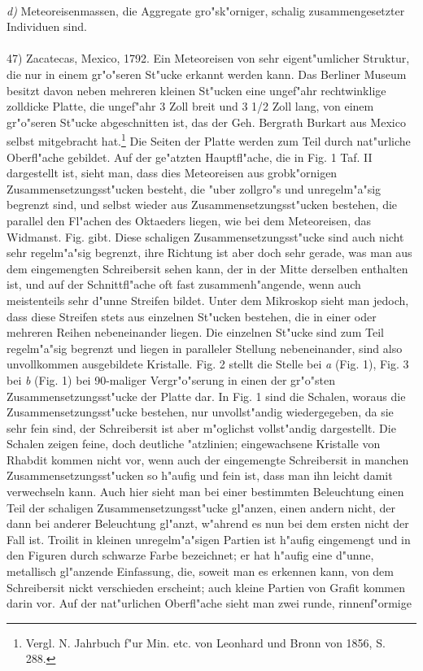 \documentclass[a4paper, 11pt, oneside]{article}
\begin{document}
\paragraph{}
\emph{d)} Meteoreisenmassen, die Aggregate gro"sk"orniger, schalig zusammengesetzter Individuen sind.
\vspace{\medskipamount}
\paragraph{}
47) Zacatecas, Mexico, 1792. Ein Meteoreisen von sehr eigent"umlicher Struktur, die nur in einem gr"o"seren St"ucke erkannt werden kann. Das Berliner Museum besitzt davon neben mehreren kleinen St"ucken eine ungef"ahr rechtwinklige zolldicke Platte, die ungef"ahr 3 Zoll breit und 3 1/2 Zoll lang, von einem gr"o"seren St"ucke abgeschnitten ist, das der Geh. Bergrath Burkart aus Mexico selbst mitgebracht hat.\footnote{Vergl. N. Jahrbuch f"ur Min. etc. von Leonhard und Bronn von 1856, S. 288.} Die Seiten der Platte werden zum Teil durch nat"urliche Oberfl"ache gebildet. Auf der ge"atzten Hauptfl"ache, die in Fig. 1 Taf. II dargestellt ist, sieht man, dass dies Meteoreisen aus grobk"ornigen Zusammensetzungsst"ucken besteht, die "uber zollgro"s und unregelm"a"sig begrenzt sind, und selbst wieder aus Zusammensetzungsst"ucken bestehen, die parallel den Fl"achen des Oktaeders liegen, wie bei dem Meteoreisen, das Widmanst. Fig. gibt. Diese schaligen Zusammensetzungsst"ucke sind auch nicht sehr regelm"a"sig begrenzt, ihre Richtung ist aber doch sehr gerade, was man aus dem eingemengten Schreibersit sehen kann, der in der Mitte derselben enthalten ist, und auf der Schnittfl"ache oft fast zusammenh"angende, wenn auch meistenteils sehr d"unne Streifen bildet. Unter dem Mikroskop sieht man jedoch, dass diese Streifen stets aus einzelnen St"ucken bestehen, die in einer oder mehreren Reihen nebeneinander liegen. Die einzelnen St"ucke sind zum Teil regelm"a"sig begrenzt und liegen in paralleler Stellung nebeneinander, sind also unvollkommen ausgebildete Kristalle. Fig. 2 stellt die Stelle bei \emph{a} (Fig. 1), Fig. 3 bei \emph{b} (Fig. 1) bei 90-maliger Vergr"o"serung in einen der gr"o"sten Zusammensetzungsst"ucke der Platte dar. In Fig. 1 sind die Schalen, woraus die Zusammensetzungsst"ucke bestehen, nur unvollst"andig wiedergegeben, da sie sehr fein sind, der Schreibersit ist aber m"oglichst vollst"andig dargestellt. Die Schalen zeigen feine, doch deutliche "atzlinien; eingewachsene Kristalle von Rhabdit kommen nicht vor, wenn auch der eingemengte Schreibersit in manchen Zusammensetzungsst"ucken so h"aufig und fein ist, dass man ihn leicht damit verwechseln kann. Auch hier sieht man bei einer bestimmten Beleuchtung einen Teil der schaligen Zusammensetzungsst"ucke gl"anzen, einen andern nicht, der dann bei anderer Beleuchtung gl"anzt, w"ahrend es nun bei dem ersten nicht der Fall ist. Troilit in kleinen unregelm"a"sigen Partien ist h"aufig eingemengt und in den Figuren durch schwarze Farbe bezeichnet; er hat h"aufig eine d"unne, metallisch gl"anzende Einfassung, die, soweit man es erkennen kann, von dem Schreibersit nickt verschieden erscheint; auch kleine Partien von Grafit kommen darin vor. Auf der nat"urlichen Oberfl"ache sieht man zwei runde, rinnenf"ormige 
\end{document}
